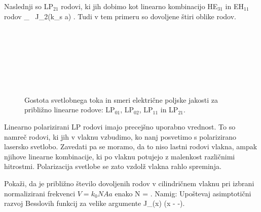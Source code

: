 Naslednji so LP$_{21}$ rodovi, ki jih dobimo kot linearno kombinacijo HE$_{31}$
in EH$_{11}$ rodov
\beq
{}_  \, J_2(k_s a)
{ \varphi \brace {}\varphi}.
\eeq
Tudi v tem primeru so dovoljene štiri oblike rodov. 

\begin{figure}[h!]
\centering
\def\svgwidth{93truemm} 
 \\
\def\svgwidth{93truemm} 
 \\
\def\svgwidth{93truemm} 
 \\
\def\svgwidth{93truemm} 
 \\
\def\svgwidth{93truemm} 
 \\
\def\svgwidth{93truemm} 
 \\
\caption{Gostota svetlobnega toka in smeri električne poljske jakosti za približno linearne rodove:
LP$_{01}$, LP$_{02}$, LP$_{11}$ in LP$_{21}$.}
\label{fig:LP}
\end{figure}

Linearno polarizirani LP rodovi imajo precejšno uporabno vrednost. To so 
namreč rodovi, ki jih v vlaknu vzbudimo, ko nanj posvetimo s polarizirano 
lasersko svetlobo. Zavedati pa se moramo, da to niso lastni rodovi vlakna, 
ampak njihove linearne kombinacije, ki po vlaknu potujejo z malenkost različnimi
hitrostmi. Polarizacija svetlobe se zato vzdolž vlakna rahlo spreminja.

\begin{definition}
Pokaži, da je približno število dovoljenih rodov v cilindričnem vlaknu pri 
izbrani normalizirani frekvenci $V = k_0 NA a$ enako
\beq 
N = .
\eeq
Namig: Upoštevaj asimptotični razvoj Besslovih funkcij za velike argumente
\beq
J_\nu (x) \approx {}\cos \left(x -  
-\right).
\eeq
\end{definition}
\newpage
